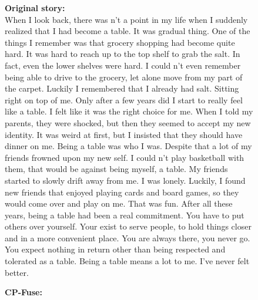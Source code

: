 \begin{figure}[!htbp]
\footnotesize
    \begin{mdframed}[
        backgroundcolor=lightgray,
        linewidth=2pt,
        linecolor=lightblue,
        frametitle={\textbf{Prompt:} You are suddenly a table . How ? Why ? When ? Feels ? What Happens ?},
        frametitlebackgroundcolor=lightblue!20,
        roundcorner=10pt,
        innerleftmargin=10pt,
        innerrightmargin=10pt,
        innertopmargin=10pt,
        innerbottommargin=10pt
    ]
    \raggedright
    \begin{minipage}[t]{\textwidth}
        \textbf{Original story:} \\
        When I look back, there was n't a point in my life when I suddenly realized that I had become a table. It was gradual thing. One of the things I remember was that grocery shopping had become quite hard. It was hard to reach up to the top shelf to grab the salt. In fact, even the lower shelves were hard. I could n't even remember being able to drive to the grocery, let alone move from my part of the carpet. Luckily I remembered that I already had salt. Sitting right on top of me.  Only after a few years did I start to really feel like a table. I felt like it was the right choice for me. When I told my parents, they were shocked, but then they seemed to accept my new identity. It was weird at first, but I insisted that they should have dinner on me. Being a table was who I was.  Despite that a lot of my friends frowned upon my new self. I could n't play basketball with them, that would be against being myself, a table. My friends started to slowly drift away from me. I was lonely. Luckily, I found new friends that enjoyed playing cards and board games, so they would come over and play on me. That was fun.  After all these years, being a table had been a real commitment. You have to put others over yourself. Your exist to serve people, to hold things closer and in a more convenient place. You are always there, you never go. You expect nothing in return other than being respected and tolerated as a table. Being a table means a lot to me. I've never felt better. \\
    \end{minipage}
    \vspace{10pt}
    \begin{minipage}[t]{\textwidth}
        \textbf{CP-Fuse:} \\

\end{minipage}
\end{mdframed}
\end{figure}
